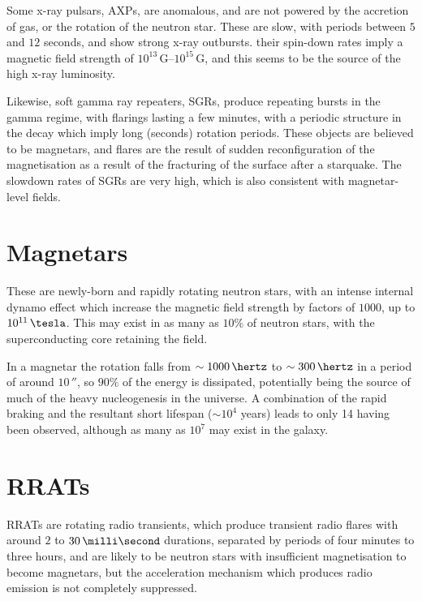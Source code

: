 Some x-ray pulsars, AXPs, are anomalous, and are not powered by the
accretion of gas, or the rotation of the neutron star. These are slow,
with periods between $5$ and $12$ seconds, and show strong x-ray
outbursts. their spin-down rates imply a magnetic field strength of
$10^{13}\,\text{G}$--$10^{15}\,\text{G}$, and this seems to be the
source of the high x-ray luminosity.

Likewise, soft gamma ray repeaters, SGRs, produce repeating bursts in
the gamma regime, with flarings lasting a few minutes, with a periodic
structure in the decay which imply long (seconds) rotation
periods. These objects are believed to be magnetars, and flares are
the result of sudden reconfiguration of the magnetisation as a result
of the fracturing of the surface after a starquake. The slowdown rates
of SGRs are very high, which is also consistent with magnetar-level
fields.

\section{Magnetars}
\label{sec:magnetars}

These are newly-born and rapidly rotating neutron stars, with an
intense internal dynamo effect which increase the magnetic field
strength by factors of $1000$, up to $10^{11}\,\tesla$. This may exist
in as many as $10\%$ of neutron stars, with the superconducting core
retaining the field.

In a magnetar the rotation falls from $\sim 1000\,\hertz$ to $\sim
300\,\hertz$ in a period of around $10\,\second$, so $90\%$ of the
energy is dissipated, potentially being the source of much of the
heavy nucleogenesis in the universe. A combination of the rapid
braking and the resultant short lifespan ($\sim 10^4$ years) leads to
only 14 having been observed, although as many as $10^7$ may exist in
the galaxy.

\section{RRATs}
\label{sec:rrats}

RRATs are rotating radio transients, which produce transient radio
flares with around $2$ to $30\,\milli\second$ durations, separated by
periods of four minutes to three hours, and are likely to be neutron
stars with insufficient magnetisation to become magnetars, but the
acceleration mechanism which produces radio emission is not completely
suppressed.

